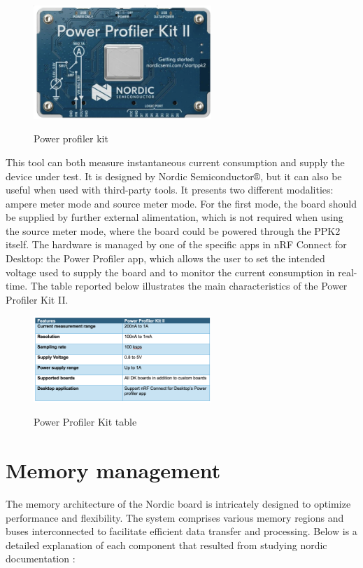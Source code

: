 \documentclass{Configuration_Files/PoliMi3i_thesis}
\begin{document}
\begin{figure}[H]
    \centering
    \includegraphics[width=0.6\textwidth]{Materials/figure4}
    \label{materials_4}
    \caption{Power profiler kit}
\end{figure}

This tool can both measure instantaneous current consumption and supply the device under test. It is designed by Nordic Semiconductor®, but it can also be useful when used with third-party tools. It presents two different modalities: ampere meter mode and source meter mode. For the first mode, the board should be supplied by further external alimentation, which is not required when using the source meter mode, where the board could be powered through the PPK2 itself. The hardware is managed by one of the specific apps in nRF Connect for Desktop: the Power Profiler app, which allows the user to set the intended voltage used to supply the board and to monitor the current consumption in real-time. The table reported below illustrates the main characteristics of the Power Profiler Kit II.

\begin{figure}[H]
    \centering
    \includegraphics[width=0.6\textwidth]{Materials/figure5}
    \label{materials_5}
    \caption{Power Profiler Kit table}
\end{figure}


\section{Memory management}

The memory architecture of the Nordic board is intricately designed to optimize performance and flexibility. The system comprises various memory regions and buses interconnected to facilitate efficient data transfer and processing. Below is a detailed explanation of each component that resulted from studying nordic documentation \cite{NordicSemiconductorInfocenter}:
\end{document}
